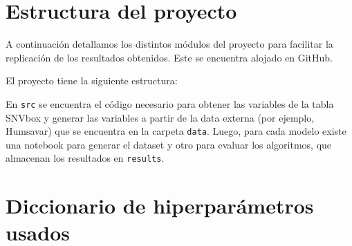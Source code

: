 \section{Estructura del proyecto}

A continuación detallamos los distintos módulos del proyecto para facilitar la replicación de los resultados obtenidos. Este se encuentra alojado en GitHub. 

El proyecto tiene la siguiente estructura:

\vspace{0.2cm}
\vspace{0.2cm}

En \texttt{src} se encuentra el código necesario para obtener las variables de la tabla SNVbox y generar las variables a partir de la data externa (por ejemplo, Humsavar) que se encuentra en la carpeta \texttt{data}. Luego, para cada modelo existe una notebook para generar el dataset y otro para evaluar los algoritmos, que almacenan los resultados en \texttt{results}. 


\section{Diccionario de hiperparámetros usados}

